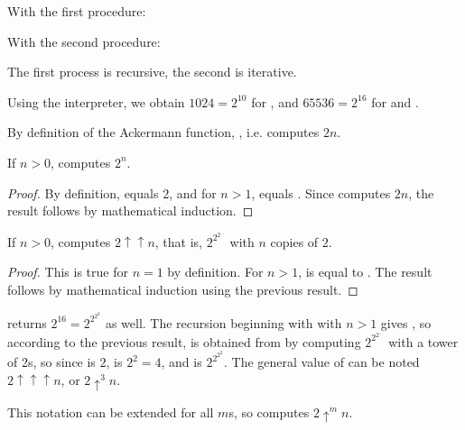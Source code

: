 \begin{exe}[1.9]
    With the first procedure:

    With the second procedure:

    The first process is recursive, the second is iterative.
\end{exe}

\begin{exe}[1.10]
    Using the interpreter, we obtain $1024 = 2^{10}$ for , and 
    $65536 = 2^{16}$ for  and .

    By definition of the Ackermann function, , i.e.
     computes $2n$.

    \medskip

    If $n > 0$,  computes $2^n$.

    \begin{proof}
        By definition,  equals $2$, and for $n > 1$,  
        equals . Since  computes $2n$,
        the result follows by mathematical induction.
    \end{proof}

    \medskip

    If $n > 0$,  computes $2 \uparrow \uparrow n$, that is, 
    $2^{2^{2^{…}}}$ with $n$ copies of $2$.

    \begin{proof}
        This is true for $n = 1$ by definition. For $n > 1$,  is 
        equal to\linebreak
        . The result follows by mathematical induction 
        using the previous result.
    \end{proof}

    \medskip

    \begin{remark}
         returns $2^{16} = 2^{2^{2^2}}$ as well. The recursion 
        beginning with  with\linebreak
        $n > 1$ gives , so according to the previous 
        result,  is obtained from  by 
        computing $2^{2^{2^{…}}}$ with a tower of
         2s, so since  is $2$,  
        is $2^2 = 4$, and  is $2^{2^{2^2}}$. The general value of 
         can be noted $2 \uparrow \uparrow \uparrow n$, or $2 
        \uparrow^3 n$.

        This notation can be extended for all $m$s, so  computes 
        $2 \uparrow^m n$.
    \end{remark}
\end{exe}

